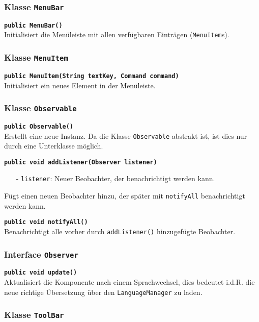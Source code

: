 \documentclass[parskip=full,11pt,twoside]{scrartcl}
\begin{document}
\subsubsection{Klasse \texttt{MenuBar}}

\textbf{\texttt{public MenuBar()}}\\
Initialisiert die Menüleiste mit allen verfügbaren Einträgen (\texttt{MenuItem}s).

\subsubsection{Klasse \texttt{MenuItem}}

\textbf{\texttt{public MenuItem(String textKey, Command command)}}\\
Initialisiert ein neues Element in der Menüleiste.

\subsubsection{Klasse \texttt{Observable}}

\textbf{\texttt{public Observable()}}\\
Erstellt eine neue Instanz. Da die Klasse \texttt{Observable} abstrakt ist, ist dies nur durch eine Unterklasse möglich.

\textbf{\texttt{public void addListener(Observer listener)}}
\begin{itemize}[noitemsep]
	\item[-] \texttt{listener}: Neuer Beobachter, der benachrichtigt werden kann.
\end{itemize}
Fügt einen neuen Beobachter hinzu, der später mit \texttt{notifyAll} benachrichtigt werden kann.

\textbf{\texttt{public void notifyAll()}}\\
Benachrichtigt alle vorher durch \texttt{addListener()} hinzugefügte Beobachter.

\subsubsection{Interface \texttt{Observer}}

\textbf{\texttt{public void update()}}\\
Aktualisiert die Komponente nach einem Sprachwechsel, dies bedeutet i.d.R. die neue richtige Übersetzung über den \texttt{LanguageManager} zu laden.

\subsubsection{Klasse \texttt{ToolBar}}
\end{document}

